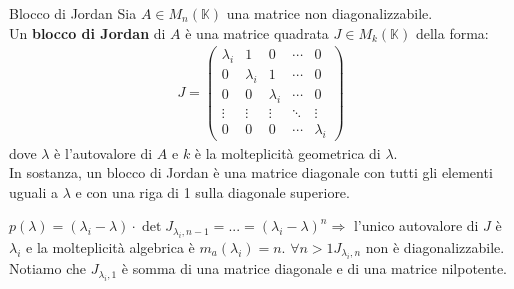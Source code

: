\documentclass[a4paper]{article}
\theoremstyle{definition}
\begin{document}
	\begin{deff}{Blocco di Jordan}{}
		Sia $A \in M_n(\mathbb{K})$ una matrice non diagonalizzabile. \\
		Un \textbf{blocco di Jordan} di $A$ è una matrice quadrata $J \in M_k(\mathbb{K})$ della forma:
		\begin{align*}
			J = \begin{pmatrix}
				\lambda_i & 1 & 0 & \cdots & 0 \\
				0 & \lambda_i & 1 & \cdots & 0 \\
				0 & 0 & \lambda_i & \cdots & 0 \\
				\vdots & \vdots & \vdots & \ddots & \vdots \\
				0 & 0 & 0 & \cdots & \lambda_i
			\end{pmatrix}
		\end{align*}
		dove $\lambda$ è l'autovalore di $A$ e $k$ è la molteplicità geometrica di $\lambda$. \\
		In sostanza, un blocco di Jordan è una matrice diagonale con tutti gli elementi uguali a $\lambda$ e con una riga di 1 sulla diagonale superiore.
	\end{deff}
	$p(\lambda) = (\lambda _i - \lambda) \cdot \det J_{\lambda_i,n-1} = ... = (\lambda_i - \lambda)^n \Rightarrow$ l'unico autovalore di $J$ è $\lambda_i$
	e la molteplicità algebrica è $m_a(\lambda_i) = n$.
	$\forall n > 1 J_{\lambda_i,n}$ non è diagonalizzabile. Notiamo che $J_{\lambda_i,1}$ è somma di una matrice diagonale e di una matrice nilpotente.
\end{document}
